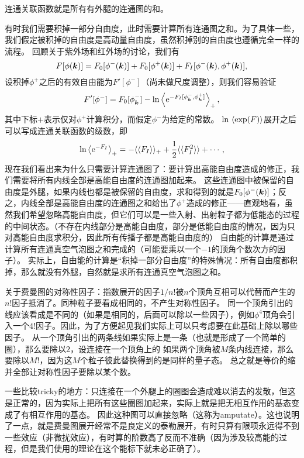 \documentclass[hyperref, UTF8, a4paper]{ctexart}
\newcommand*{\ee}{\mathrm{e}}
\newcommand*{\cexpval}[1]{\langle \langle #1 \rangle \rangle}
\begin{document}
连通关联函数就是所有有外腿的连通图的和。

有时我们需要积掉一部分自由度，此时需要计算所有连通图之和。为了具体一些，我们假定被积掉的自由度是高动量自由度，虽然积掉别的自由度也遵循完全一样的流程。
回顾关于紫外场和红外场的讨论，我们有
\[
    F[\phi(\vb*{k})] = F_0 [\phi^-(\vb*{k})] + F_0 [\phi^+(\vb*{k})] + F_I [\phi^-(\vb*{k}) , \phi^+ (\vb*{k})],
\]
设积掉$\phi^+$之后的有效自由能为$F'[\phi^-]$（尚未做尺度调整），则我们容易验证
\[
    F'[\phi^-] = F_0[\phi^-_{\vb*{k}}] - \ln \expval{\ee^{-F_I[\phi_{\vb*{k}}^-, \phi_{\vb*{k}}^+]}}_+,
\]
其中下标$+$表示仅对$\phi^+$计算积分，而假定$\phi^-$为给定的常数。
$\ln \expval*{\exp(F)}$展开之后可以写成连通关联函数的级数，即
\begin{equation}
    \ln \expval{\ee^{-F_I}}_+ = - \cexpval{F_I}_+ + \frac{1}{2} \cexpval{F_I^2} + \cdots,
\end{equation}
现在我们看出来为什么只需要计算连通图了：要计算出高能自由度造成的修正，我们需要将所有内线全部是高能自由度的连通图加起来。
这些连通图中被保留的自由度是外腿，如果内线也都是被保留的自由度，求和得到的就是$F_0[\phi^-(\vb*{k})]$；反之，内线全部是高能自由度的连通图之和给出了$\phi^+$造成的修正——直观地看，虽然我们希望忽略高能自由度，但它们可以是一些入射、出射粒子都为低能态的过程的中间状态。（不存在内线部分是高能自由度，部分是低能自由度的情况，因为只对高能自由度求积分，因此所有传播子都是高能自由度的）
自由能的计算是通过计算所有连通真空气泡图之和完成的（可能要乘以一个$-1$的顶角个数次方的因子）。
实际上，自由能的计算是“积掉一部分自由度”的特殊情况：所有自由度都积掉，那么就没有外腿，自然就是求所有连通真空气泡图之和。

关于费曼图的对称性因子：指数展开的因子$1/n!$被$n$个顶角互相可以代替而产生的$n!$因子抵消了。同种粒子要看成相同的，不产生对称性因子。
同一个顶角引出的线应该看成是不同的（如果是相同的，后面可以除以一些因子），例如$\phi^4$顶角会引入一个$4!$因子。因此，为了方便起见我们实际上可以只考虑要在此基础上除以哪些因子。
从一个顶角引出的两条线如果实际上是一条（也就是形成了一个简单的圈），那么要除以$2$，设连接在一个顶角上的
如果两个顶角被$M$条内线连接，那么要除以$M!$，因为这$M$个粒子彼此替换得到的是同样的量子态。
总之就是等价的缩并全部让对称性因子要除以某个数。

一些比较tricky的地方：只连接在一个外腿上的圈图会造成难以消去的发散，但这是正常的，因为实际上把所有这些圈图加起来，实际上就是把无相互作用的基态变成了有相互作用的基态。
因此这种图可以直接忽略（这称为amputate）。这也说明了一点，就是费曼图展开经常不是良定义的泰勒展开，有时只算有限项永远得不到一些效应（非微扰效应），有时算的阶数高了反而不准确（因为涉及较高能的过程，但是我们使用的理论在这个能标下就未必正确了）。

\end{document}
